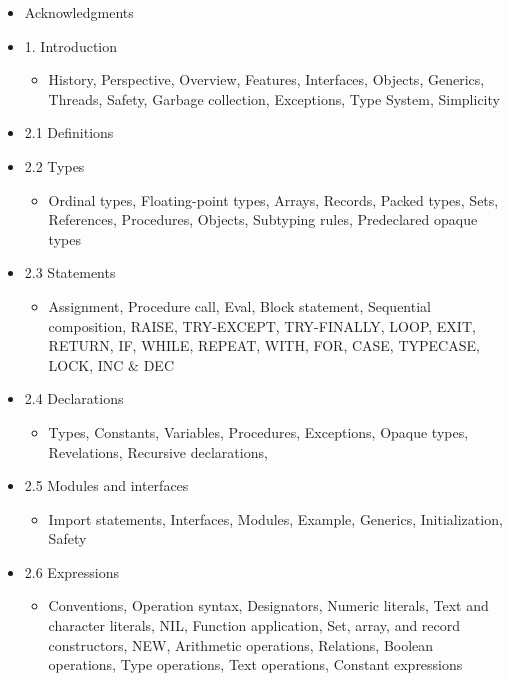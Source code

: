 \documentclass[10pt]{article}
\begin{document}
\begin{itemize}
\item Acknowledgments
\item 1. Introduction
  \begin{itemize}
  \item History, Perspective, Overview, Features, Interfaces, Objects,
    Generics, Threads, Safety, Garbage collection, Exceptions, Type System,
    Simplicity
  \end{itemize}

\item 2.1 Definitions
\item 2.2 Types
  \begin{itemize}
  \item Ordinal types, Floating-point types, Arrays, Records, Packed types,
    Sets, References, Procedures, Objects, Subtyping rules, Predeclared opaque
    types
  \end{itemize}

\item 2.3 Statements
  \begin{itemize}
  \item Assignment, Procedure call, Eval, Block statement, Sequential
    composition, RAISE, TRY-EXCEPT, TRY-FINALLY, LOOP, EXIT, RETURN, IF,
    WHILE, REPEAT, WITH, FOR, CASE, TYPECASE, LOCK, INC \& DEC
  \end{itemize}

\item 2.4 Declarations
  \begin{itemize}
  \item Types, Constants, Variables, Procedures, Exceptions, Opaque types,
    Revelations, Recursive declarations,
  \end{itemize}

\item 2.5 Modules and interfaces
  \begin{itemize}
  \item Import statements, Interfaces, Modules, Example, Generics,
    Initialization, Safety
  \end{itemize}

\item 2.6 Expressions
  \begin{itemize}
  \item Conventions, Operation syntax, Designators, Numeric literals, Text and
    character literals, NIL, Function application, Set, array, and record
    constructors, NEW, Arithmetic operations, Relations, Boolean operations,
    Type operations, Text operations, Constant expressions
  \end{itemize}


\end{itemize}
\end{document}
